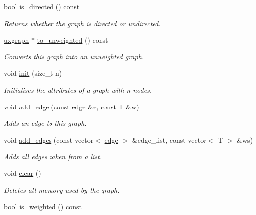 \begin{DoxyCompactItemize}
bool \hyperlink{classlgraph_1_1utils_1_1wdgraph_a5eee58626ec0aa8428436a859d601741}{is\+\_\+directed} () const 
\begin{DoxyCompactList}\small\item\em Returns whether the graph is directed or undirected. \end{DoxyCompactList}\item 
\hyperlink{classlgraph_1_1utils_1_1uxgraph}{uxgraph} $\ast$ \hyperlink{classlgraph_1_1utils_1_1wdgraph_a0282369d3514119684e6ca6668e4514b}{to\+\_\+unweighted} () const 
\begin{DoxyCompactList}\small\item\em Converts this graph into an unweighted graph. \end{DoxyCompactList}\item 
void \hyperlink{classlgraph_1_1utils_1_1wxgraph_a566ae9fe69209230ef159ed350ab8f7f}{init} (size\+\_\+t n)
\begin{DoxyCompactList}\small\item\em Initialises the attributes of a graph with {\itshape n} nodes. \end{DoxyCompactList}\item 
void \hyperlink{classlgraph_1_1utils_1_1wxgraph_adc945f23e3008ee9ef3f65dc5656e953}{add\+\_\+edge} (const \hyperlink{namespacelgraph_1_1utils_a6510284ce1b1ae5dc97ce5d2de426e10}{edge} \&e, const T \&w)
\begin{DoxyCompactList}\small\item\em Adds an edge to this graph. \end{DoxyCompactList}\item 
void \hyperlink{classlgraph_1_1utils_1_1wxgraph_a972a2483966f4b1d485c5d14157ee9be}{add\+\_\+edges} (const vector$<$ \hyperlink{namespacelgraph_1_1utils_a6510284ce1b1ae5dc97ce5d2de426e10}{edge} $>$ \&edge\+\_\+list, const vector$<$ T $>$ \&ws)
\begin{DoxyCompactList}\small\item\em Adds all edges taken from a list. \end{DoxyCompactList}\item 
void \hyperlink{classlgraph_1_1utils_1_1wxgraph_a421bc8166e35335445e45efc680ebe3f}{clear} ()
\begin{DoxyCompactList}\small\item\em Deletes all memory used by the graph. \end{DoxyCompactList}\item 
bool \hyperlink{classlgraph_1_1utils_1_1wxgraph_adda596cfbf72080d46ab445679fe092f}{is\+\_\+weighted} () const \hypertarget{classlgraph_1_1utils_1_1wxgraph_adda596cfbf72080d46ab445679fe092f}{}\label{classlgraph_1_1utils_1_1wxgraph_adda596cfbf72080d46ab445679fe092f}


\end{DoxyCompactItemize}
